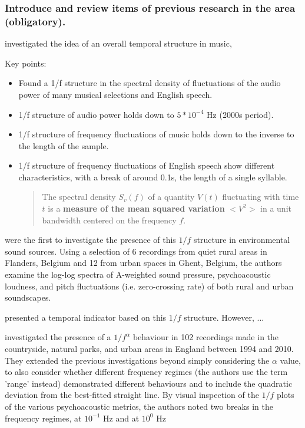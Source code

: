 \subsubsection{Introduce and review items of previous research in the area (obligatory).}

\cite{Jeon2011Non} investigated the idea of an overall temporal structure in music,

Key points:
\begin{itemize}
  \item Found a 1/f structure in the spectral density of fluctuations of the audio power of many musical selections and English speech.
  \item 1/f structure of audio power holds down to $5 * 10^{-4}$ Hz (2000s period).
  \item 1/f structure of frequency fluctuations of music holds down to the inverse to the length of the sample.
  \item 1/f structure of frequency fluctuations of English speech show different characteristics, with a break of around 0.1s, the length of a single syllable.
        \begin{quote}
          The spectral density $S_v(f)$ of a quantity $V(t)$ fluctuating with time $t$ is a \textbf{measure of the mean squared variation} $<V^2>$ in a unit bandwidth centered on the frequency $f$.
        \end{quote}


\end{itemize}


\citet{deCoensel20031f} were the first to investigate the presence of this $1/f$ structure in environmental sound sources. Using a selection of 6 recordings from quiet rural areas in Flanders, Belgium and 12 from urban spaces in Ghent, Belgium, the authors examine the log-log spectra of A-weighted sound pressure, psychoacoustic loudness, and pitch fluctuations (i.e. zero-crossing rate) of both rural and urban soundscapes.




\cite{Botteldooren2006temporal} presented a temporal indicator based on this \(1/f\) structure. However, ...

\citet{Yang2015Presence} investigated the presence of a $1/f^{\alpha}$ behaviour in 102 recordings made in the countryside, natural parks, and urban areas in England between 1994 and 2010. They extended the previous investigations beyond simply considering the $\alpha$ value, to also consider whether different frequency regimes (the authors use the term 'range' instead) demonstrated different behaviours and to include the quadratic deviation from the best-fitted straight line. By visual inspection of the $1/f$ plots of the various psychoacoustic metrics, the authors noted two breaks in the frequency regimes, at $10^{-1}$ Hz and at $10^0$ Hz

